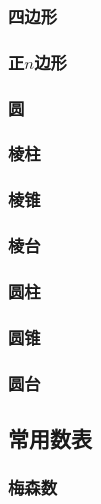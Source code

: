 \documentclass[a4paper]{article}
\begin{document}
\subsubsection{四边形}

\subsubsection{正$n$边形}

\subsubsection{圆}

\subsubsection{棱柱}

\subsubsection{棱锥}

\subsubsection{棱台}

\subsubsection{圆柱}

\subsubsection{圆锥}

\subsubsection{圆台}

\subsection{常用数表}

\subsubsection{梅森数}
\end{document}

